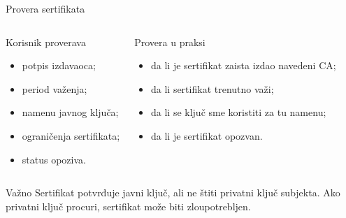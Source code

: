\documentclass[aspectratio=1610]{beamer}
\begin{document}
\begin{frame}[t]{Provera sertifikata}
\small
\begin{columns}[T,onlytextwidth]
\begin{block}{Korisnik proverava}
\begin{itemize}
    \item potpis izdavaoca;
    \item period važenja;
    \item namenu javnog ključa;
    \item ograničenja sertifikata;
    \item status opoziva.
\end{itemize}
\end{block}

\begin{block}{Provera u praksi}
\begin{itemize}
    \item da li je sertifikat zaista izdao navedeni CA;
    \item da li sertifikat trenutno važi;
    \item da li se ključ sme koristiti za tu namenu;
    \item da li je sertifikat opozvan.
\end{itemize}
\end{block}
\end{columns}

\vspace{0.3em}
\begin{alertblock}{Važno}
Sertifikat potvrđuje javni ključ, ali ne štiti privatni ključ subjekta. Ako privatni ključ procuri, sertifikat može biti zloupotrebljen.
\end{alertblock}
\end{frame}
\end{document}
